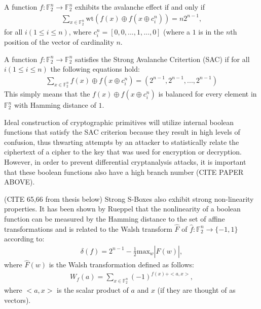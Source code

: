 \documentclass[11pt]{article}
\newcommand{\field}[1]{\mathbb{#1}} %
\begin{document}
\begin{define}
A function $f : \field{F}_2^n \to \field{F}_2^n$ exhibits the avalanche effect if and only if 
\begin{eqnarray*}
\sum_{x \in \field{F}_2^n} \text{wt}(f(x) \oplus f(x \oplus c_{i}^{n})) = n2^{n-1},
\end{eqnarray*}
for all $i (1 \leq i \leq n)$, where $c_{i}^{n} = [0, 0, ..., 1, ..., 0]$ (where a $1$ is in the $n$th position of the vector of cardinality $n$.
\end{define}

\begin{define}
A function $f : \field{F}_2^n \to \field{F}_2^n$ satisfies the Strong Avalanche Critertion (SAC) if for all $i (1 \leq i \leq n)$ the following equations hold:
\begin{eqnarray*}
\sum_{x \in \field{F}_2^n} f(x) \oplus f(x \oplus c_i^n) = (2^{n-1}, 2^{n-1}, ..., 2^{n-1})
\end{eqnarray*}
This simply means that the $f(x) \oplus f(x \oplus c_i^n)$ is balanced for every element in $\field{F}_2^n$ with Hamming distance of $1$. 
\end{define}

Ideal construction of cryptographic primitives will utilize internal boolean functions that satisfy the SAC criterion because they result in high levels of confusion, thus thwarting attempts by an attacker to statistically relate the ciphertext of a cipher to the key that was used for encryption or decryption. However, in order to prevent differential cryptanalysis attacks, it is important that these boolean functions also have a high branch number (CITE PAPER ABOVE).

(CITE 65,66 from thesis below)
Strong S-Boxes also exhibit strong non-linearity properties. It has been shown by Rueppel that the nonlinearity of a boolean function can be measured by the Hamming distance to the set of affine transformations and is related to the Walsh transform $\hat{F}$ of $\hat{f} : \field{F}_2^n \to \{-1, 1\}$ according to:
\begin{eqnarray*}
\delta(f)  = 2^{n-1} - \frac{1}{2}\text{max}_w|\hat{F}(w)|,
\end{eqnarray*}
where $\hat{F}(w)$ is the Walsh transformation defined as follows:
\begin{eqnarray*}
W_f(a) = \sum_{x \in \field{F}_2^n} (-1)^{f(x) + <a,x>},
\end{eqnarray*}
where $<a,x>$ is the scalar product of $a$ and $x$ (if they are thought of as vectors).
\end{document}
